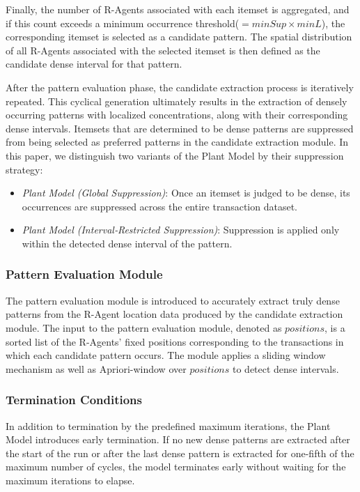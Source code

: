 Finally, the number of R-Agents associated with each itemset is aggregated, and if this count exceeds a  minimum occurrence threshold($= minSup \times minL$), the corresponding itemset is selected as a candidate pattern. The spatial distribution of all R-Agents associated with the selected itemset is then defined as the candidate dense interval for that pattern.

After the pattern evaluation phase, the candidate extraction process is iteratively repeated. This cyclical generation ultimately results in the extraction of densely occurring patterns with localized concentrations, along with their corresponding dense intervals.
Itemsets that are determined to be dense patterns are suppressed from being selected as preferred patterns in the candidate extraction module. In this paper, we distinguish two variants of the Plant Model by their suppression strategy:
\begin{itemize}
  \item \emph{Plant Model (Global Suppression)}: Once an itemset is judged to be dense, its occurrences are suppressed across the entire transaction dataset.
  \item \emph{Plant Model (Interval‑Restricted Suppression)}: Suppression is applied only within the detected dense interval of the pattern.
\end{itemize}




\subsubsection{Pattern Evaluation Module}
% 

The pattern evaluation module is introduced to accurately extract truly dense patterns from the R-Agent location data produced by the candidate extraction module.
The input to the pattern evaluation module, denoted as \(positions\), is a sorted list of the R-Agents’ fixed positions corresponding to the transactions in which each candidate pattern occurs. The module applies a sliding window mechanism as well as Apriori-window over \(positions\) to detect dense intervals. 



\subsubsection{Termination Conditions}
In addition to termination by the predefined maximum iterations, the Plant Model introduces early termination. If no new dense patterns are extracted after the start of the run or after the last dense pattern is extracted for one-fifth of the maximum number of cycles, the model terminates early without waiting for the maximum iterations to elapse.


